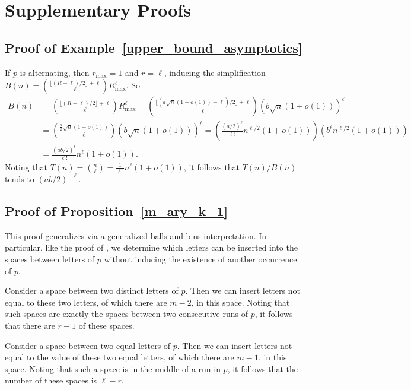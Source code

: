 \documentclass[11pt]{amsart}
\begin{document}
\section{Supplementary Proofs}\label{appendix}

\subsection{Proof of Example~\ref{upper_bound_asymptotics}}
    If $p$ is alternating, then $r_{\max}=1$ and $r=\ell$, inducing the simplification $B(n)=\binom{\lfloor(R-\ell)/2\rfloor+\ell}{\ell}R_{\max}^{\ell}$. So
    \begin{align*}
        B(n)&=\binom{\lfloor(R-\ell)/2\rfloor+\ell}{\ell}R_{\max}^{\ell}=\binom{\lfloor(a\sqrt{n}(1+o(1))-\ell)/2\rfloor+\ell}{\ell}\left(b\sqrt{n}(1+o(1))\right)^{\ell}\\
        &={\frac{a}{2}\sqrt{n}(1+o(1))\choose\ell}\left(b\sqrt{n}(1+o(1))\right)^{\ell}=\left(\frac{(a/2)^{\ell}}{\ell!}n^{\ell/2}(1+o(1))\right)\left(b^{\ell}n^{\ell/2}(1+o(1))\right)\\
        &=\frac{(ab/2)^{\ell}}{\ell!}n^{\ell}(1+o(1)).
    \end{align*}
    Noting that $T(n)={n\choose\ell}=\frac{1}{\ell!}n^{\ell}(1+o(1))$, it follows that $T(n)/B(n)$ tends to $(ab/2)^{-\ell}$.

\subsection{Proof of Proposition~\ref{m_ary_k_1}}
    This proof generalizes \cite[Proposition 3.2]{subseq_freq} via a generalized balls-and-bins interpretation. In particular, like the proof of \cite[Proposition 3.2]{subseq_freq}, we determine which letters can be inserted into the spaces between letters of $p$ without inducing the existence of another occurrence of $p$.

    Consider a space between two distinct letters of $p$. Then we can insert letters not equal to these two letters, of which there are $m-2$, in this space. Noting that such spaces are exactly the spaces between two consecutive runs of $p$, it follows that there are $r-1$ of these spaces.

    Consider a space between two equal letters of $p$. Then we can insert letters not equal to the value of these two equal letters, of which there are $m-1$, in this space. Noting that such a space is in the middle of a run in $p$, it follows that the number of these spaces is $\ell-r$.
\end{document}
